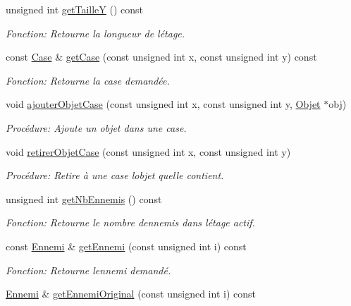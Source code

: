 \begin{DoxyCompactItemize}
unsigned int \mbox{\hyperlink{classEtage_aedda7013ef98a6f05c717361ea684724}{get\+TailleY}} () const
\begin{DoxyCompactList}\small\item\em Fonction\+: Retourne la longueur de l\textquotesingle{}étage. \end{DoxyCompactList}\item 
const \mbox{\hyperlink{structCase}{Case}} \& \mbox{\hyperlink{classEtage_aa0845897f1e30d2e1190bcf5e9c587f5}{get\+Case}} (const unsigned int x, const unsigned int y) const
\begin{DoxyCompactList}\small\item\em Fonction\+: Retourne la case demandée. \end{DoxyCompactList}\item 
void \mbox{\hyperlink{classEtage_a511bd4eb7731939a549956da943e4a4d}{ajouter\+Objet\+Case}} (const unsigned int x, const unsigned int y, \mbox{\hyperlink{structObjet}{Objet}} $\ast$obj)
\begin{DoxyCompactList}\small\item\em Procédure\+: Ajoute un objet dans une case. \end{DoxyCompactList}\item 
void \mbox{\hyperlink{classEtage_a6a14519a624e9cd4344db1fe8f32843b}{retirer\+Objet\+Case}} (const unsigned int x, const unsigned int y)
\begin{DoxyCompactList}\small\item\em Procédure\+: Retire à une case l\textquotesingle{}objet qu\textquotesingle{}elle contient. \end{DoxyCompactList}\item 
unsigned int \mbox{\hyperlink{classEtage_a94fadf180dbb582505f45b4028b26e13}{get\+Nb\+Ennemis}} () const
\begin{DoxyCompactList}\small\item\em Fonction\+: Retourne le nombre d\textquotesingle{}ennemis dans l\textquotesingle{}étage actif. \end{DoxyCompactList}\item 
const \mbox{\hyperlink{classEnnemi}{Ennemi}} \& \mbox{\hyperlink{classEtage_ac58fe7dbff45182fb598721adf679c0a}{get\+Ennemi}} (const unsigned int i) const
\begin{DoxyCompactList}\small\item\em Fonction\+: Retourne l\textquotesingle{}ennemi demandé. \end{DoxyCompactList}\item 
\mbox{\hyperlink{classEnnemi}{Ennemi}} \& \mbox{\hyperlink{classEtage_a3c7f9414f1392dff9d2a5e7fcaf0d1cd}{get\+Ennemi\+Original}} (const unsigned int i) const

\end{DoxyCompactItemize}
